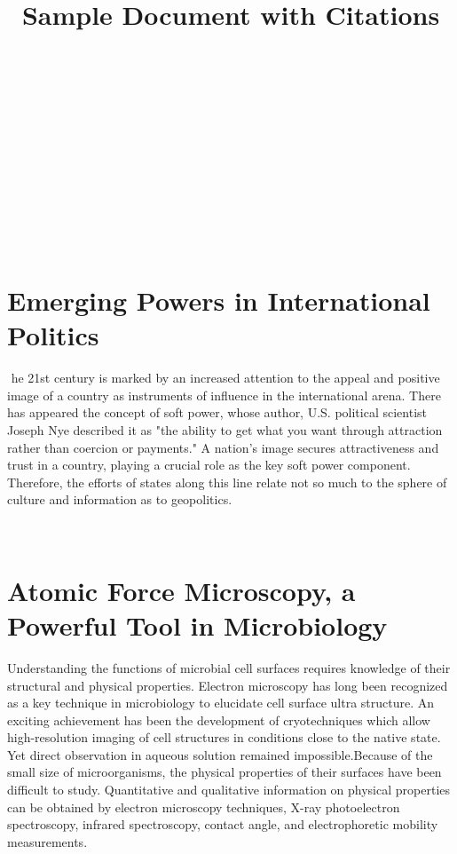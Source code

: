 \documentclass{article}
\begin{document}
​

​\title{Sample Document with Citations}

​\author{}

​\date{}

​\maketitle

​\section{Emerging Powers in International Politics}

​  he 21st century is marked by an increased attention to the appeal and positive image of a country as instruments of influence in the international arena\cite{bohomolov2012ghost}. There has appeared the concept of soft power, whose author, U.S\cite{sergunin2015understanding}. political scientist Joseph Nye described it as "the ability to get what you want through attraction rather than coercion or payments\cite{hill2006moscow}." A nation's image secures attractiveness and trust in a country, playing a crucial role as the key soft power component\cite{kiseleva2015russia}. Therefore, the efforts of states along this line relate not so much to the sphere of culture and information as to geopolitics\cite{kosachev2012spsecific}.

​\section{Atomic Force Microscopy, a Powerful Tool in Microbiology}

     Understanding the functions of microbial cell surfaces requires knowledge of their structural and physical properties\cite{dufrene2002atomic}. Electron microscopy has long been recognized as a key technique in microbiology to elucidate cell surface ultra structure\cite{engel1999atomic}. An exciting achievement has been the development of cryotechniques which allow high-resolution imaging of cell structures in conditions close to the native state\cite{franz2008atomic}. Yet direct observation in aqueous solution remained impossible.Because of the small size of microorganisms, the physical properties of their surfaces have been difficult to study\cite{marrese2017atomic}. Quantitative and qualitative information on physical properties can be obtained by electron microscopy techniques, X-ray photoelectron spectroscopy, infrared spectroscopy, contact angle, and electrophoretic mobility measurements\cite{altman2015noncontact}.

​

​

​
\end{document}
